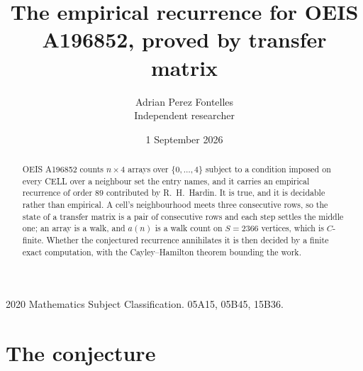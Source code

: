 \documentclass[11pt,a4paper]{article}
\title{The empirical recurrence for OEIS A196852, proved by transfer matrix}
\author{Adrian Perez Fontelles\\ \small Independent researcher}
\date{1 September 2026}
\theoremstyle{plain}
\theoremstyle{definition}
\begin{document}
\maketitle

\begin{abstract}
OEIS A196852 counts $n\times4$ arrays over $\{0,\dots,4\}$ subject to a condition imposed on
every CELL over a neighbour set the entry names, and it carries an empirical recurrence of
order $89$ contributed by R.~H.~Hardin. It is true, and it is decidable rather than
empirical. A cell's neighbourhood meets three consecutive rows, so the state of a transfer
matrix is a pair of consecutive rows and each step settles the middle one; an array is a
walk, and $a(n)$ is a walk count on $S=2366$ vertices, which is $C$-finite. Whether the
conjectured recurrence annihilates it is then decided by a finite exact computation, with the
Cayley--Hamilton theorem bounding the work.
\end{abstract}

\noindent\small 2020 Mathematics Subject Classification. 05A15, 05B45, 15B36.\normalsize

\section{The conjecture}
\end{document}
